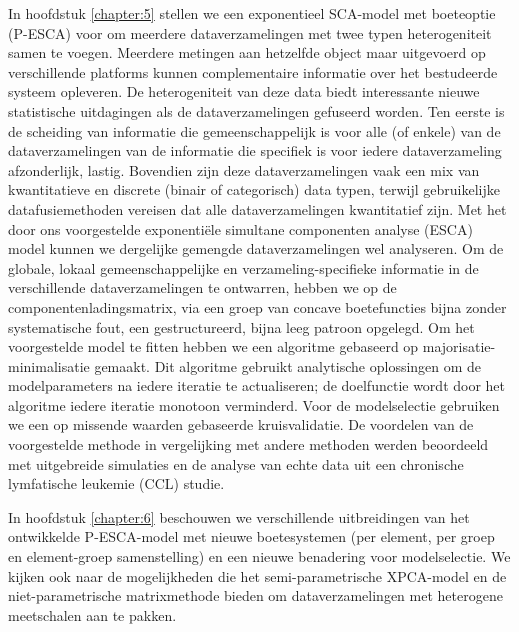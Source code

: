 In hoofdstuk \ref{chapter:5} stellen we een exponentieel SCA-model met boeteoptie (P-ESCA) voor om meerdere dataverzamelingen met twee typen heterogeniteit samen te voegen. Meerdere metingen aan hetzelfde object maar uitgevoerd op verschillende platforms kunnen complementaire informatie over het bestudeerde systeem opleveren. De heterogeniteit van deze data biedt interessante nieuwe statistische uitdagingen als de dataverzamelingen gefuseerd worden. Ten eerste is de scheiding van informatie die gemeenschappelijk is voor alle (of enkele) van de dataverzamelingen van de informatie die specifiek is voor iedere dataverzameling afzonderlijk, lastig. Bovendien zijn deze dataverzamelingen vaak een mix van kwantitatieve en discrete (binair of categorisch) data typen, terwijl gebruikelijke datafusiemethoden vereisen dat alle dataverzamelingen kwantitatief zijn. Met het door ons voorgestelde exponenti\"ele simultane componenten analyse (ESCA) model kunnen we dergelijke gemengde dataverzamelingen wel analyseren. Om de globale, lokaal gemeenschappelijke en verzameling-specifieke informatie in de verschillende dataverzamelingen te ontwarren, hebben we op de componentenladingsmatrix, via een groep van concave boetefuncties bijna zonder systematische fout, een gestructureerd, bijna leeg patroon opgelegd. Om het voorgestelde model te fitten hebben we een algoritme gebaseerd op majorisatie-minimalisatie gemaakt. Dit algoritme gebruikt analytische oplossingen om de modelparameters na iedere iteratie te actualiseren; de doelfunctie wordt door het algoritme iedere iteratie monotoon verminderd. Voor de modelselectie gebruiken we een op missende waarden gebaseerde kruisvalidatie. De voordelen van de voorgestelde methode in vergelijking met andere methoden werden beoordeeld met uitgebreide simulaties en de analyse van echte data uit een chronische lymfatische leukemie (CCL) studie.

In hoofdstuk \ref{chapter:6} beschouwen we verschillende uitbreidingen van het ontwikkelde P-ESCA-model met nieuwe boetesystemen (per element, per groep en element-groep samenstelling) en een nieuwe benadering voor modelselectie. We kijken ook naar de mogelijkheden die het semi-parametrische XPCA-model en de niet-parametrische matrixmethode bieden om dataverzamelingen met heterogene meetschalen aan te pakken.
 